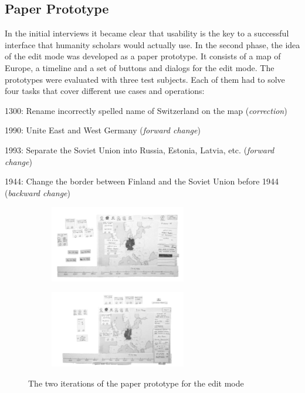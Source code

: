 

\subsection{Paper Prototype} %
\label{sub:paper_prototype}

In the initial interviews it became clear that usability is the key to a successful interface that humanity scholars would actually use. In the second phase, the idea of the edit mode was developed as a paper prototype. It consists of a map of Europe, a timeline and a set of buttons and dialogs for the edit mode. The prototypes were evaluated with three test subjects. Each of them had to solve four tasks that cover different use cases and operations:
\begin{compactenum}
  \item 1300: Rename incorrectly spelled name of Switzerland on the map (\emph{correction})
  \item 1990: Unite East and West Germany (\emph{forward change})
  \item 1993: Separate the Soviet Union into Russia, Estonia, Latvia, etc. (\emph{forward change})
  \item 1944: Change the border between Finland and the Soviet Union before 1944 (\emph{backward change})
\end{compactenum}

\begin{figure}[H]
\centering
\begin{subfigure}{.5\textwidth}
  \centering
  \includegraphics[width=225px]{graphics/development/user_interface_design_process/paper_prototype_1.png}
\end{subfigure}%
\begin{subfigure}{.5\textwidth}
  \centering
  \includegraphics[width=225px]{graphics/development/user_interface_design_process/paper_prototype_2.png}
\end{subfigure}
\caption{The two iterations of the paper prototype for the edit mode}
\label{fig:paper_prototypes}
\end{figure}

